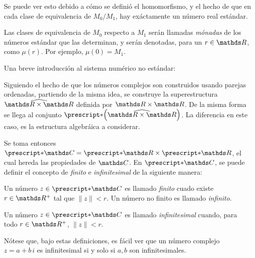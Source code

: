 Se puede ver esto debido a cómo se definió el homomorfismo, y el hecho
de que en cada clase de equivalencia de $M_0/M_1$, hay exáctamente un
número real estándar.
\begin{definition}
  Las clases de equivalencia de $M_0$ respecto a $M_1$ serán llamadas
  \emph{mónadas} de los números estándar que las determinan, y serán
  denotadas, para un $r\in\R$, como $\mu(r)$. Por ejemplo,
  $\mu(0) = M_1$.
\end{definition}

Una breve introducción al sistema numérico no estándar:

Siguiendo el hecho de que los números complejos son construidos usando
parejas ordenadas, partiendo de la misma idea, se construye la
superestructura $\widehat{\R\times\R}$ definida por $\R\times\R$. De la
misma forma se llega al conjunto $\st{\left(\widehat{\R\times\R}\right)}$.
La diferencia en este caso, es la estructura algebráica a considerar.

Se toma entonces $\st{\C} = \st{\R}\times\st{\R}$, el cual hereda las
propiedades de $\C$. En $\st{\C}$, se puede definir el concepto de
\emph{finito} e \emph{infinitesimal} de la siguiente manera:
\begin{definition}
  Un número $z\in\st{\C}$ es llamado \emph{finito} cuado existe
  $r\in\R^+$ tal que $\|z\| < r$. Un número no finito es llamado
  \emph{infinito}.

  Un número $z\in\st{\C}$ es llamado \emph{infinitesimal} cuando, para
  todo $r\in\R^+$, $\|z\| < r$.
\end{definition}

Nótese que, bajo estas definiciones, es fácil ver que un número complejo
$z = a + b\,i$ es infinitesimal si y solo si $a,b$ son infinitesimales.

